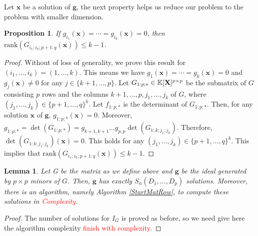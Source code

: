 \documentclass[11pt]{article}
\numberwithin{Property}{section}
\numberwithin{Theorem}{section}
\newtheorem{Proposition}{Proposition}%
\numberwithin{Proposition}{section}
\newtheorem{Lemma}{Lemma}%
\numberwithin{Lemma}{section}
\numberwithin{Corollary}{section}
\numberwithin{Definition}{section}
\numberwithin{Remark}{section}
\numberwithin{Conjecture}{section}
\numberwithin{Problem}{section}
\numberwithin{Claim}{section}
\theoremstyle{definition}
\numberwithin{Example}{section}
\def\g {\ensuremath{\mathbf{g}}}
\renewcommand{\leq}{\leqslant}
\newcommand{\field}{\mathbb{K}} %
\newcommand{\mat}[1]{\mathbf{\MakeUppercase{#1}}} %
\newcommand{\todo}[1]{\textcolor{red}{#1}} %
\begin{document}
Let $\mathbf{x}$ be a solution of $\g$, the next property helps us reduce our problem to the problem with smaller dimension. 
\begin{Proposition} \label{r2}
If $g_{i_1}(\mathbf{x}) = \cdots = g_{i_k}(\mathbf{x}) = 0$, then $\mathrm{rank}(G_{i_1:i_k\mathbf{;}p+1:q}({\mathbf{x}})) \leq k-1$.
\end{Proposition}
\begin{proof} Without of loss of generality, we prove this result for $(i_1, \ldots, i_k) = (1, \ldots, k)$. This means we have $g_{1}(\mathbf{x}) = \cdots = g_{k}(\mathbf{x}) = 0$ and $g_{j}(\mathbf{x}) \ne 0$ for any $j \in \{k+1, \ldots, p\}$. Let $G_{1:p;*} \in \field[\mat{X}]^{p \times p}$ be the submatrix of $G$ consisting $p$ rows and the columns $k+1, \ldots, p, j_1, \ldots, j_k$ of $G$, where $(j_1, \ldots, j_k) \in \{p+1, \ldots, q\}^{k}$. Let $f_{1:p;*}$ is the determinant of $G_{1:p;*}$. Then, for any solution $\mathbf{x}$ of $\g$, $g_{1:p;*}(\mathbf{x}) = 0$. Moreover, $g_{1:p;*} = \det(G_{1:p;*}) = g_{k+1,k+1} \ldots g_{p,p} \det(G_{1:k;j_1:j_k})$. Therefore, $\det(G_{1:k;j_1:j_k})(\mathbf{x}) = 0$. This holds for any $(j_1, \ldots, j_k) \in \{p+1, \ldots, q\}^{k}$. This implies that $\mathrm{rank}(G_{i_1:i_k\mathbf{;}p+1:q}({\mathbf{x}})) \leq k-1$. 
\end{proof}

\begin{Lemma}\label{P3} Let G be the matrix as we define above and $\g$ be the ideal generated by $p \times p$ minors of $G$. Then, $\g$ has exactly $S_{n}(D_1, \ldots, D_p)$ solutions. Moreover, there is an algorithm, namely Algorithm \ref{StartMatRow}, to compute these solutions in \todo{Complexity}. 
\end{Lemma}
\begin{proof}
The number of solutions for $I_G$ is proved as before, so we need give here the algorithm complexity \todo{finish with complexity}.  
\end{proof}
\end{document}
